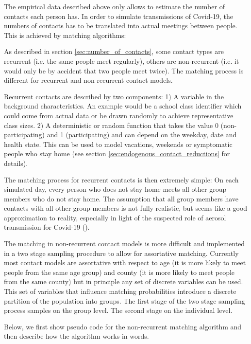 The empirical data described above only allows to estimate the number of contacts each person has. In order to simulate transmissions of Covid-19, the numbers of contacts has to be translated into actual meetings between people. This is achieved by matching algorithms:

As described in section \ref{sec:number_of_contacts}, some contact types are recurrent (i.e. the same people meet regularly), others are non-recurrent (i.e. it would only be by accident that two people meet twice). The matching process is different for recurrent and non recurrent contact models.

Recurrent contacts are described by two components: 1) A variable in the background characteristics. An example would be a school class identifier which could come from actual data or be drawn randomly to achieve representative class sizes. 2) A deterministic or random function that takes the value 0 (non-participating) and 1 (participating) and can depend on the weekday, date and health state. This can be used to model vacations, weekends or symptomatic people who stay home (see section \ref{sec:endogenous_contact_reductions} for details).

The matching process for recurrent contacts is then extremely simple: On each simulated day, every person who does not stay home meets all other group members who do not stay home. The assumption that all group members have contacts with all other group members is not fully realistic, but seems like a good approximation to reality, especially in light of the suspected role of aerosol transmission for Covid-19 (\cite{Morawska2020, Anderson2020}).

The matching in non-recurrent contact models is more difficult and implemented in a two stage sampling procedure to allow for assortative matching. Currently most contact models are assortative with respect to age (it is more likely to meet people from the same age group) and county (it is more likely to meet people from the same county) but in principle any set of discrete variables can be used. This set of variables that influence matching probabilities introduce a discrete partition of the population into groups. The first stage of the two stage sampling process samples on the group level. The second stage on the individual level.

Below, we first show pseudo code for the non-recurrent matching algorithm and then describe how the algorithm works in words.


